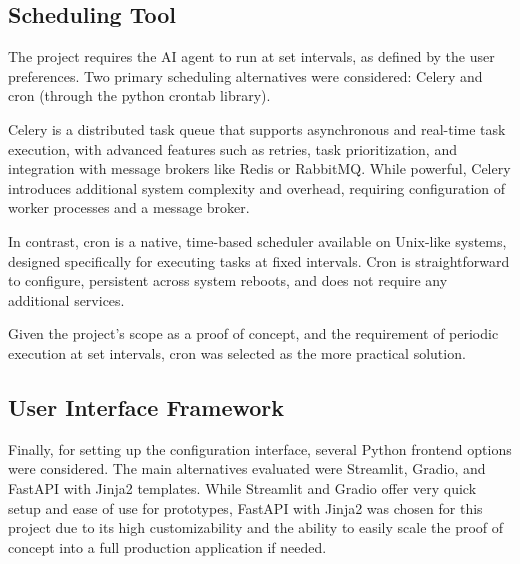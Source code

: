 \documentclass[a4paper]{report}
\begin{document}
\subsection{Scheduling Tool}

The project requires the AI agent to run at set intervals, as defined by the user preferences. Two primary scheduling alternatives were considered: Celery and cron (through the python crontab library).

Celery is a distributed task queue that supports asynchronous and real-time task execution, with advanced features such as retries, task prioritization, and integration with message brokers like Redis or RabbitMQ. While powerful, Celery introduces additional system complexity and overhead, requiring configuration of worker processes and a message broker.

In contrast, cron is a native, time-based scheduler available on Unix-like systems, designed specifically for executing tasks at fixed intervals. Cron is straightforward to configure, persistent across system reboots, and does not require any additional services.

Given the project's scope as a proof of concept, and the requirement of periodic execution at set intervals, cron was selected as the more practical solution.

\subsection{User Interface Framework}

Finally, for setting up the configuration interface, several Python frontend options were considered. The main alternatives evaluated were Streamlit, Gradio, and FastAPI with Jinja2 templates. While Streamlit and Gradio offer very quick setup and ease of use for prototypes, FastAPI with Jinja2 was chosen for this project due to its high customizability and the ability to easily scale the proof of concept into a full production application if needed.
\end{document}
